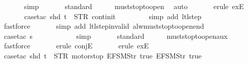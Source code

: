 \begin{isabellebody}
\ \ \ \ \ \isamarkupfalse%
\ simp\isanewline
\ \ \ \ \ \isamarkupfalse%
\ standard\isanewline
\ \ \ \ \isamarkupfalse%
\ must{\isacharunderscore}stop{\isacharunderscore}to{\isacharunderscore}open\ \isamarkupfalse%
\ auto{\isacharbrackleft}{}{\isacharbrackright}\isanewline
\ \ \ \ \ \isamarkupfalse%
\ {\isacharparenleft}erule\ exE{\isacharparenright}{\isacharplus}\isanewline
\ \ \ \ \ \isamarkupfalse%
\ {\isacharparenleft}case{\isacharunderscore}tac\ {\isachardoublequoteopen}shd\ t\ {\isacharequal}\ {\isacharparenleft}STR\ {\isacharprime}{\isacharprime}continit{\isacharprime}{\isacharprime}{\isacharcomma}\ {\isacharbrackleft}{\isacharbrackright}{\isacharparenright}{\isachardoublequoteclose}{\isacharparenright}\isanewline
\ \ \ \ \ \ \isamarkupfalse%
\ {\isacharparenleft}simp\ add{\isacharcolon}\ ltl{\isacharunderscore}step{\isacharunderscore}{}{\isacharparenright}\isanewline
\ \ \ \ \ \ \isamarkupfalse%
\ fastforce\isanewline
\ \ \ \ \ \isamarkupfalse%
\ {\isacharparenleft}simp\ add{\isacharcolon}\ ltl{\isacharunderscore}step{\isacharunderscore}{}{\isacharunderscore}invalid\ alw{\isacharunderscore}must{\isacharunderscore}stop{\isacharunderscore}to{\isacharunderscore}open{\isacharunderscore}end{\isacharparenright}\isanewline
\isanewline
\ \ \ \ \isamarkupfalse%
\ {\isacharparenleft}case{\isacharunderscore}tac\ {\isachardoublequoteopen}s\ {\isasymin}\ {\isacharbraceleft}{}{\isacharcomma}\ {}{\isacharcomma}\ {}{\isacharcomma}\ {}{\isacharbraceright}{\isachardoublequoteclose}{\isacharparenright}\isanewline
\ \ \ \ \ \isamarkupfalse%
\ simp\isanewline
\ \ \ \ \ \isamarkupfalse%
\ standard\isanewline
\ \ \ \ \isamarkupfalse%
\ must{\isacharunderscore}stop{\isacharunderscore}to{\isacharunderscore}open{\isacharunderscore}aux{}\ \isamarkupfalse%
\ fastforce\isanewline
\ \ \ \ \ \isamarkupfalse%
\ {\isacharparenleft}erule\ conjE{\isacharparenright}\isanewline
\ \ \ \ \ \isamarkupfalse%
\ {\isacharparenleft}erule\ exE{\isacharparenright}{\isacharplus}\isanewline
\ \ \ \ \ \isamarkupfalse%
\ {\isacharparenleft}case{\isacharunderscore}tac\ {\isachardoublequoteopen}shd\ t\ {\isacharequal}\ {\isacharparenleft}STR\ {\isacharprime}{\isacharprime}motorstop{\isacharprime}{\isacharprime}{\isacharcomma}\ {\isacharbrackleft}EFSM{\isachardot}Str\ {\isacharprime}{\isacharprime}true{\isacharprime}{\isacharprime}{\isacharcomma}\ EFSM{\isachardot}Str\ {\isacharprime}{\isacharprime}true{\isacharprime}{\isacharprime}{\isacharbrackright}{\isacharparenright}{\isachardoublequoteclose}{\isacharparenright}\isanewline

\end{isabellebody}

